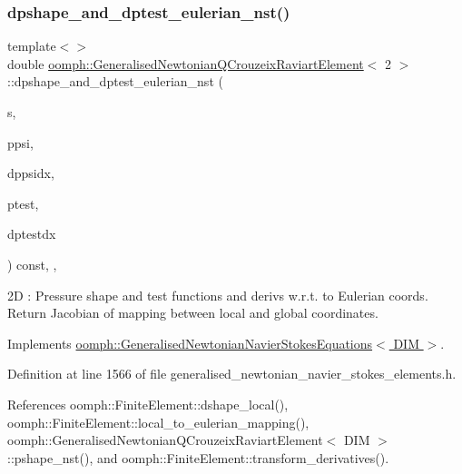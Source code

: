 \subsubsection{\texorpdfstring{dpshape\+\_\+and\+\_\+dptest\+\_\+eulerian\+\_\+nst()}{dpshape\_and\_dptest\_eulerian\_nst()}\hspace{0.1cm}{\footnotesize\ttfamily [2/3]}}
{\footnotesize\ttfamily template$<$$>$ \\
double \hyperlink{classoomph_1_1GeneralisedNewtonianQCrouzeixRaviartElement}{oomph\+::\+Generalised\+Newtonian\+Q\+Crouzeix\+Raviart\+Element}$<$ 2 $>$\+::dpshape\+\_\+and\+\_\+dptest\+\_\+eulerian\+\_\+nst (\begin{DoxyParamCaption}\item[{const \hyperlink{classoomph_1_1Vector}{Vector}$<$ double $>$ \&}]{s,  }\item[{\hyperlink{classoomph_1_1Shape}{Shape} \&}]{ppsi,  }\item[{\hyperlink{classoomph_1_1DShape}{D\+Shape} \&}]{dppsidx,  }\item[{\hyperlink{classoomph_1_1Shape}{Shape} \&}]{ptest,  }\item[{\hyperlink{classoomph_1_1DShape}{D\+Shape} \&}]{dptestdx }\end{DoxyParamCaption}) const\hspace{0.3cm}{\ttfamily [inline]}, {\ttfamily [protected]}, {\ttfamily [virtual]}}

2D \+: Pressure shape and test functions and derivs w.\+r.\+t. to Eulerian coords. Return Jacobian of mapping between local and global coordinates. 

Implements \hyperlink{classoomph_1_1GeneralisedNewtonianNavierStokesEquations_a00027d27dfdf3c0b72b0d1df9addfdc8}{oomph\+::\+Generalised\+Newtonian\+Navier\+Stokes\+Equations$<$ D\+I\+M $>$}.



Definition at line 1566 of file generalised\+\_\+newtonian\+\_\+navier\+\_\+stokes\+\_\+elements.\+h.



References oomph\+::\+Finite\+Element\+::dshape\+\_\+local(), oomph\+::\+Finite\+Element\+::local\+\_\+to\+\_\+eulerian\+\_\+mapping(), oomph\+::\+Generalised\+Newtonian\+Q\+Crouzeix\+Raviart\+Element$<$ D\+I\+M $>$\+::pshape\+\_\+nst(), and oomph\+::\+Finite\+Element\+::transform\+\_\+derivatives().

\mbox{\label{classoomph_1_1GeneralisedNewtonianQCrouzeixRaviartElement_a57837b3d35eda32c93e24d9de4a651a1}} 
